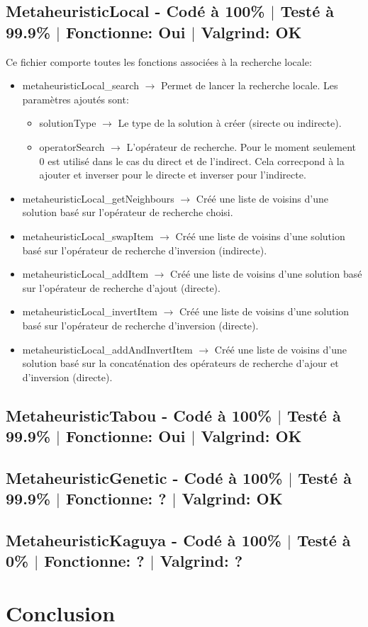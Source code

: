 \documentclass{EPUProjetPeiP}
\newcommand{\comp}[5]{
	\section[#1]{#1 {\small - Codé à #2\% $\vert$ Testé à #3\% $\vert$ Fonctionne: #4 $\vert$ Valgrind: #5}}
}
\begin{document}
\comp{MetaheuristicLocal}{100}{99.9}{Oui}{OK}
Ce fichier comporte toutes les fonctions associées à la recherche locale:
\begin{itemize}
	\item metaheuristicLocal\_search $\longrightarrow$ Permet de lancer la recherche locale. Les paramètres ajoutés sont:
	\begin{itemize}
		\item solutionType $\longrightarrow$ Le type de la solution à créer (sirecte ou indirecte).
		\item operatorSearch $\longrightarrow$ L'opérateur de recherche. Pour le moment seulement 0 est utilisé dans le cas du direct et de l'indirect. Cela correcpond à la ajouter et inverser pour le directe et inverser pour l'indirecte.
	\end{itemize}
	\item metaheuristicLocal\_getNeighbours $\longrightarrow$ Créé une liste de voisins d'une solution basé sur l'opérateur de recherche choisi.
	\item metaheuristicLocal\_swapItem $\longrightarrow$ Créé une liste de voisins d'une solution basé sur l'opérateur de recherche d'inversion (indirecte).
	\item metaheuristicLocal\_addItem $\longrightarrow$ Créé une liste de voisins d'une solution basé sur l'opérateur de recherche d'ajout (directe).
	\item metaheuristicLocal\_invertItem $\longrightarrow$ Créé une liste de voisins d'une solution basé sur l'opérateur de recherche d'inversion (directe).
	\item metaheuristicLocal\_addAndInvertItem $\longrightarrow$ Créé une liste de voisins d'une solution basé sur la concaténation des opérateurs de recherche d'ajour et d'inversion (directe).
\end{itemize}

\comp{MetaheuristicTabou}{100}{99.9}{Oui}{OK}

\comp{MetaheuristicGenetic}{100}{99.9}{?}{OK}

\comp{MetaheuristicKaguya}{100}{0}{?}{?}

\chapter*{Conclusion}

\label{sec:conclusion}
\end{document}
